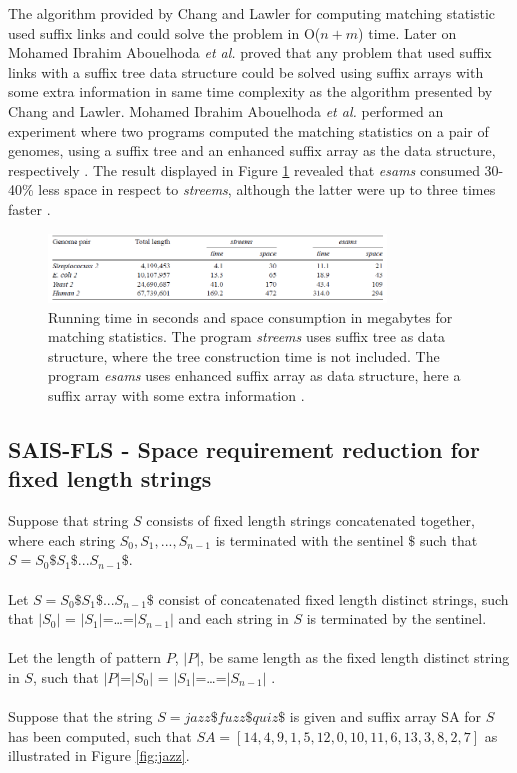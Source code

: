 \documentclass[12pt]{article} %
\begin{document}
The algorithm provided by Chang and Lawler \cite{enchancedsuffix} for computing matching statistic used suffix links and could solve the problem in O($n+m$) time. Later on Mohamed Ibrahim Abouelhoda \emph{et al.} \cite{enchancedsuffix} proved that any problem that used suffix links with a suffix tree data structure could be solved using suffix arrays with some extra information in same time complexity as the algorithm presented by Chang and Lawler\cite{enchancedsuffix}. Mohamed Ibrahim Abouelhoda \emph{et al.} performed an experiment where two programs computed the matching statistics on a pair of genomes, using a suffix tree and an enhanced suffix array as the data structure, respectively \cite{enchancedsuffix}. The result displayed in Figure \ref{fig:matchingtest} revealed that \emph{esams} consumed 30-40\% less space in respect to \emph{streems}, although the latter were up to three times faster \cite{enchancedsuffix}.  

\begin{figure}[H]
    \centering
    \includegraphics[width=0.8\textwidth]{matchingtest}
    \captionsetup{width=0.8
    \textwidth}
    \caption{Running time in seconds and space consumption in megabytes for matching statistics. The program \emph{streems} uses suffix tree as data structure, where the tree construction time is not included. The program \emph{esams} uses enhanced suffix array as data structure, here a suffix array with some extra information \cite{enchancedsuffix}. }
    \label{fig:matchingtest}
\end{figure}

\subsection{SAIS-FLS - Space requirement reduction for fixed length strings} \label{SAIS-FLS}

Suppose that string $S$ consists of fixed length strings concatenated together, where each string $S_0,S_1,...,S_{n-1}$ is terminated with the sentinel $\$$ such that $S=S_0\$S_1\$...S_{n-1}\$ $.
\\ \\
Let $S=S_0\$S_1\$...S_{n-1}\$ $ consist of concatenated fixed length distinct strings, such that $|S_0|$ = $|S_1|$=…=$|S_{n-1}|$ and each string in $S$ is terminated by the sentinel.
\\ \\
Let the length of pattern $P$, $|P|$, be same length as the fixed length distinct string in $S$, such that $|P|$=$|S_0|$ = $|S_1|$=…=$|S_{n-1}|$ .
\\ \\
Suppose that the string $S=jazz\$fuzz\$quiz\$$  is given and suffix array SA for $S$ has been computed, such that $SA=[14,4,9,1,5,12,0,10,11,6,13,3,8,2,7]$ as illustrated in Figure \ref{fig:jazz}.
\end{document}
